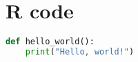 \chapter{R code} \label{Rcode}

\begin{lstlisting}[language=Python]
def hello_world():
    print("Hello, world!")
\end{lstlisting}